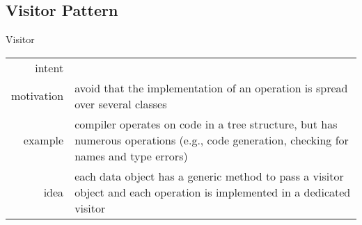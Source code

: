 \subsection{Visitor Pattern}
\begin{frame}{\insertsubsection}
	\begin{fancycolumns}
		\begin{definition}{Visitor \mysource{\gof}}
			\setlength\tabcolsep{1mm}
			\begin{tabularx}{\textwidth}{rX}				
				intent & \mycite{Represent an operation to be performed on the elements of an object structure.}\\
				motivation & avoid that the implementation of an operation is spread over several classes\\
				example & compiler operates on code in a tree structure, but has numerous operations (e.g., code generation, checking for names and type errors)\\
				idea & each data object has a generic method to pass a visitor object and each operation is implemented in a dedicated visitor
			\end{tabularx}
		\end{definition}
		\nextcolumn
	\end{fancycolumns}
\end{frame}


%
